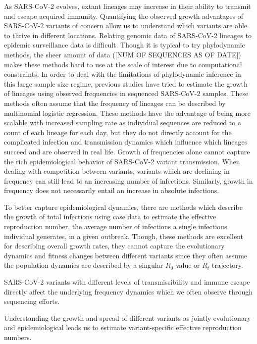 \documentclass[12pt]{article}
\begin{document}
As SARS-CoV-2 evolves, extant lineages may increase in their ability to transmit and escape acquired immunity. %
Quantifying the observed growth advantages of SARS-CoV-2 variants of concern allow us to understand which variants are able to thrive in different locations.
Relating genomic data of SARS-CoV-2 lineages to epidemic surveillance data is difficult. 
Though it is typical to try phylodynamic methods, the sheer amount of data ([NUM OF SEQUENCES AS OF DATE]) makes these methods hard to use at the scale of interest due to computational constraints.
In order to deal with the limitations of phylodynamic inference in this large sample size regime, previous studies have tried to estimate the growth of lineages using observed frequencies in sequenced SARS-CoV-2 samples. %
These methods often assume that the frequency of lineages can be described by multinomial logistic regression. \cite{Ito2021} 
These methods have the advantage of being more scalable with increased sampling rate as individual sequences are reduced to a count of each lineage for each day, but they do not directly account for the complicated infection and transmission dynamics which influence which lineages succeed and are observed in real life.
Growth of frequencies alone cannot capture the rich epidemiological behavior of SARS-CoV-2 variant transmission.
When dealing with competition between variants, variants which are declining in frequency can still lead to an increasing number of infections. 
Similarly, growth in frequency does not necessarily entail an increase in absolute infections.

To better capture epidemiological dynamics, there are methods which describe the growth of total infections using case data to estimate the effective reproduction number, the average number of infections a single infectious individual generates, in a given outbreak.
Though, these methods are excellent for describing overall growth rates, they cannot capture the evolutionary dynamics and fitness changes between different variants since they often assume the population dynamics are described by a singular $R_{0}$ value or $R_{t}$ trajectory. \cites{Cori2013, Abbott2020} %

SARS-CoV-2 variants with different levels of transmissibility and immune escape directly affect the underlying frequency dynamics which we often observe through sequencing efforts.

Understanding the growth and spread of different variants as jointly evolutionary and epidemiological leads us to estimate variant-specific effective reproduction numbers.
\end{document}
